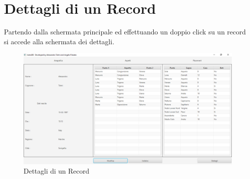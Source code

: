 \section{Dettagli di un Record}
Partendo dalla schermata principale ed effettuando un doppio click su un record si accede alla schermata dei dettagli.
\begin{figure}[H]
\centering
\includegraphics[width=\textwidth, height=0.35\textheight, keepaspectratio]{img/c5/PersonView.png}
\caption{Dettagli di un Record}
\label{fig:details}
\end{figure}

